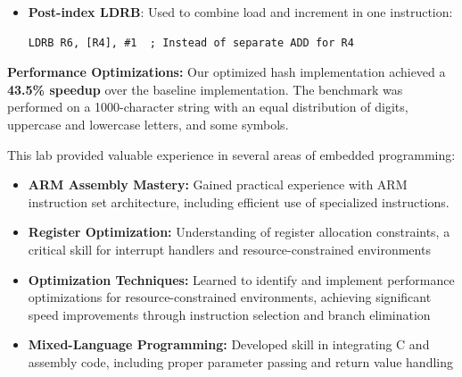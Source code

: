 \documentclass[a4paper,12pt]{article}
\newenvironment{sectionbox}[1]{%
    \tcolorbox[
        colback=titleblue!5,
        colframe=titleblue!50,
        arc=3mm,
        title=#1,
        fonttitle=\bfseries\sffamily,
        before skip=1.2em,
        after skip=1.2em
    ]
}{\endtcolorbox}
\begin{document}
\begin{sectionbox}{Optimization Techniques}
\begin{itemize}[leftmargin=2em]
    \item \textbf{Post-index LDRB}: Used to combine load and increment in one instruction:
    \begin{lstlisting}[language={[x86masm]Assembler}]
    LDRB R6, [R4], #1  ; Instead of separate ADD for R4
    \end{lstlisting}


\end{itemize}

\begin{tcolorbox}[colback=titleblue!3,colframe=titleblue!30,arc=2mm]
\textbf{Performance Optimizations:} Our optimized hash implementation achieved a 
\textbf{43.5\% speedup} over the baseline implementation. The benchmark was performed on 
a 1000-character string with an equal distribution of digits, uppercase and lowercase letters, and some symbols.
\end{tcolorbox}
\end{sectionbox}






\begin{sectionbox}{Conclusion \& Learning Outcomes}
This lab provided valuable experience in several areas of embedded programming:

\begin{itemize}[leftmargin=2em]
    \item \textbf{ARM Assembly Mastery:} Gained practical experience with ARM instruction set architecture, including efficient use of specialized instructions.
    
    \item \textbf{Register Optimization:} Understanding of register allocation constraints, a critical skill for interrupt handlers and resource-constrained environments
    
    \item \textbf{Optimization Techniques:} Learned to identify and implement performance optimizations for resource-constrained environments, achieving significant speed improvements through instruction selection and branch elimination
    
    \item \textbf{Mixed-Language Programming:} Developed skill in integrating C and assembly code, including proper parameter passing and return value handling    
\end{itemize}

\end{sectionbox}
\end{document}
